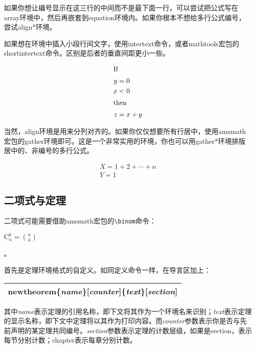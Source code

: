 {如果你想让编号显示在这三行的中间而不是最下面一行，可以尝试把公式写在array环境中，然后再嵌套到equation环境内。如果你根本不想给多行公式编号，尝试align*环境。

如果想在环境中插入小段行间文字，使用intertext命令，或者mathtools宏包的shortintertext命令。区别是后者的垂直间距更小一些。

\begin{codeshow}
\begin{align*}
\shortintertext{If}
 y &= 0 \\
 x &< 0\\
\shortintertext{then}
 z &= x+y
\end{align*}
\end{codeshow}

当然，align环境是用来分列对齐的。如果你仅仅想要所有行居中，使用amsmath宏包的gather环境即可。这是一个非常实用的环境，你也可以用gather*环境排版居中的、非编号的多行公式。

\begin{codeshow}
\begin{gather}
  X=1+2+\cdots+n \\
  Y=1
\end{gather}
\end{codeshow}

\subsection{二项式与定理}
二项式可能需要借助amsmath宏包的\verb|\binom|命令：

\begin{codeshow}
  $\mathrm{C}_n^k=\binom{n}{k}$
\end{codeshow}

。

首先是定理环境格式的自定义。如同定义命令一样，在导言区加上：

\noindent\begin{tabular}{|l|}
\hline
\char92{}newtheorem\{\textit{name}\}[\textit{counter}]\{\textit{text}\}[\textit{section}] \\
\hline
\end{tabular}

其中\textit{name}表示定理的引用名称，即下文将其作为一个环境名来识别；\textit{text}表示定理的显示名称，即下文中定理将以其作为打印内容。而\textit{counter}参数表示你是否与先前声明的某定理共同编号。\textit{section}参数表示定理的计数层级，如果是section，表示每节分别计数；chapter表示每章分别计数。

}
